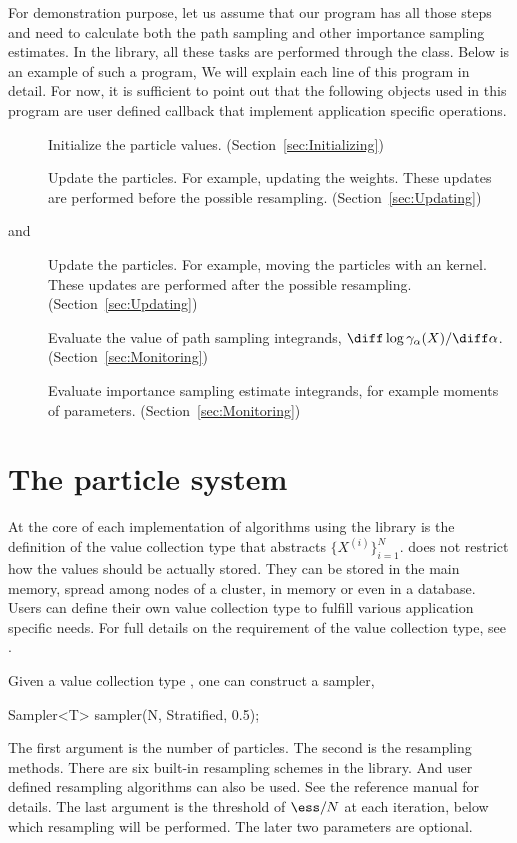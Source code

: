 For demonstration purpose, let us assume that our program has all those steps and need to calculate both the path sampling and other importance sampling estimates. In the \vsmc library, all these tasks are performed through the  class. Below is an example of such a program,
We will explain each line of this program in detail. For now, it is sufficient to point out that the following objects used in this program are user defined callback that implement application specific operations.
\begin{description}
  \item[] Initialize the particle values. (Section~\ref{sec:Initializing})
  \item[] Update the particles. For example, updating the weights. These updates are performed before the possible resampling. (Section~\ref{sec:Updating})
  \item[ and ] Update the particles. For example, moving the particles with an \mcmc kernel. These updates are performed after the possible resampling. (Section~\ref{sec:Updating})
  \item[] Evaluate the value of path sampling integrands, $\diff\log\gamma_{\alpha}(X)/\diff\alpha$. (Section~\ref{sec:Monitoring})
  \item[] Evaluate importance sampling estimate integrands, for example moments of parameters. (Section~\ref{sec:Monitoring})
\end{description}

\section{The particle system}
\label{sec:The particle system}

At the core of each implementation of \smc algorithms using the \vsmc library is the definition of the value collection type that abstracts $\{X^{(i)}\}_{i=1}^N$. \vsmc does not restrict how the values should be actually stored. They can be stored in the main memory, spread among nodes of a cluster, in \gpu memory or even in a database. Users can define their own value collection type to fulfill various application specific needs. For full details on the requirement of the value collection type, see \cite{vsmcjss}.

Given a value collection type , one can construct a sampler,
\begin{cppcode}
Sampler<T> sampler(N, Stratified, 0.5);
\end{cppcode}
The first argument is the number of particles. The second is the resampling methods. There are six built-in resampling schemes in the library. And user defined resampling algorithms can also be used. See the reference manual for details. The last argument is the threshold of $\ess/N$ at each iteration, below which resampling will be performed. The later two parameters are optional.

